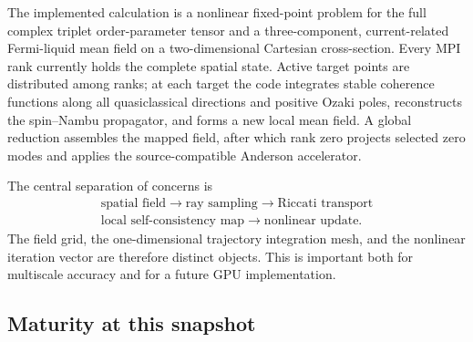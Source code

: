 \documentclass[11pt,a4paper]{article}
\begin{document}
The implemented calculation is a nonlinear fixed-point problem for the full
complex triplet order-parameter tensor and a three-component, current-related
Fermi-liquid mean field on a two-dimensional Cartesian cross-section.  Every
MPI rank currently holds the complete spatial state.  Active target points are
distributed among ranks; at each target the code integrates stable coherence
functions along all quasiclassical directions and positive Ozaki poles,
reconstructs the spin--Nambu propagator, and forms a new local mean field.  A
global reduction assembles the mapped field, after which rank zero projects
selected zero modes and applies the source-compatible Anderson accelerator.

The central separation of concerns is
\begin{equation}
  \begin{gathered}
  \boxed{\text{spatial field}}
  \longrightarrow
  \boxed{\text{ray sampling}}
  \longrightarrow
  \boxed{\text{Riccati transport}}\\[2mm]
  \boxed{\text{local self-consistency map}}
  \longrightarrow
  \boxed{\text{nonlinear update}} .
  \end{gathered}
\end{equation}
The field grid, the one-dimensional trajectory integration mesh, and the
nonlinear iteration vector are therefore distinct objects.  This is important
both for multiscale accuracy and for a future GPU implementation.

\subsection*{Maturity at this snapshot}
\end{document}
